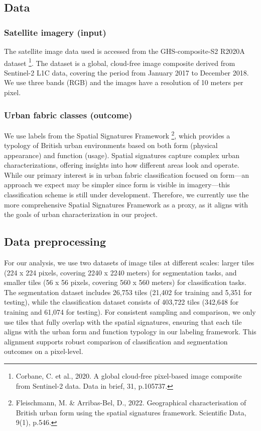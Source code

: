 \documentclass[
  letterpaper,
  DIV=11,
  numbers=noendperiod]{scrartcl}
\begin{document}
\subsection{Data}\label{data}

\subsubsection{Satellite imagery (input)}\label{satellite-imagery-input}

The satellite image data used is accessed from the GHS-composite-S2
R2020A dataset \footnote{Corbane, C. et al., 2020. A global cloud-free
  pixel-based image composite from Sentinel-2 data. Data in brief, 31,
  p.105737.}. The dataset is a global, cloud-free image composite
derived from Sentinel-2 L1C data, covering the period from January 2017
to December 2018. We use three bands (RGB) and the images have a
resolution of 10 meters per pixel.

\subsubsection{Urban fabric classes
(outcome)}\label{urban-fabric-classes-outcome}

We use labels from the Spatial Signatures Framework \footnote{Fleischmann,
  M. \& Arribas-Bel, D., 2022. Geographical characterisation of British
  urban form using the spatial signatures framework. Scientific Data,
  9(1), p.546.}, which provides a typology of British urban environments
based on both form (physical appearance) and function (usage). Spatial
signatures capture complex urban characterizations, offering insights
into how different areas look and operate. While our primary interest is
in urban fabric classification focused on form---an approach we expect
may be simpler since form is visible in imagery---this classification
scheme is still under development. Therefore, we currently use the more
comprehensive Spatial Signatures Framework as a proxy, as it aligns with
the goals of urban characterization in our project.

\subsection{Data preprocessing}\label{data-preprocessing}

For our analysis, we use two datasets of image tiles at different
scales: larger tiles (224 x 224 pixels, covering 2240 x 2240 meters) for
segmentation tasks, and smaller tiles (56 x 56 pixels, covering 560 x
560 meters) for classification tasks. The segmentation dataset includes
26,753 tiles (21,402 for training and 5,351 for testing), while the
classification dataset consists of 403,722 tiles (342,648 for training
and 61,074 for testing). For consistent sampling and comparison, we only
use tiles that fully overlap with the spatial signatures, ensuring that
each tile aligns with the urban form and function typology in our
labeling framework. This alignment supports robust comparison of
classification and segmentation outcomes on a pixel-level.
\end{document}
